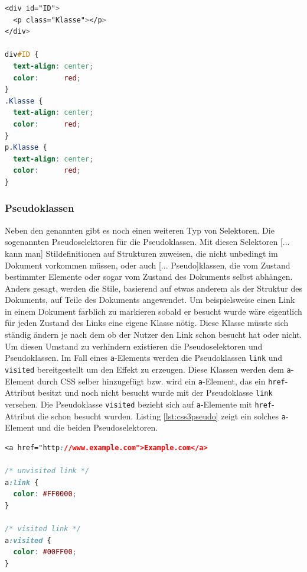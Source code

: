 \vspace{1em}
\begin{lstlisting}[language=CSS, caption=CSS3 Klassen- und ID-Selektoren, label=lst:css3idclass]
<div id="ID">
  <p class="Klasse"></p>
</div>

div#ID {
  text-align: center;
  color:      red;
}
.Klasse {
  text-align: center;
  color:      red;
}
p.Klasse {
  text-align: center;
  color:      red;
}
\end{lstlisting}
	
\subsubsection{Pseudoklassen} Neben den genannten gibt es noch einen weiteren Typ von Selektoren. Die sogenannten Pseudoselektoren für die Pseudoklassen. \glqq Mit diesen Selektoren [... kann man] Stildefinitionen auf Strukturen zuweisen, die nicht unbedingt im Dokument vorkommen müssen, oder auch [... Pseudo]klassen, die vom Zustand bestimmter Elemente oder sogar vom Zustand des Dokuments selbst abhängen. Anders gesagt, werden die Stile, basierend auf etwas anderem als der Struktur des Dokuments, auf Teile des Dokuments angewendet.\grqq{}\cite[S.53ff]{MeyeCasc2005} Um beispielsweise einen Link in einem Dokument farblich zu markieren sobald er besucht wurde wäre eigentlich für jeden Zustand des Links eine eigene Klasse nötig. Diese Klasse müsste sich ständig ändern je nach dem ob der Nutzer den Link schon besucht hat oder nicht. Um diesen Umstand zu verhindern existieren die Pseudoselektoren und Pseudoklassen. Im Fall eines \texttt{a}-Elements werden die Pseudoklassen \texttt{link} und \texttt{visited} bereitgestellt um den Effekt zu erzeugen. Diese Klassen werden dem \texttt{a}-Element durch CSS selber hinzugefügt bzw. wird ein \texttt{a}-Element, das ein \texttt{href}-Attribut besitzt und noch nicht besucht wurde mit der Pseudoklasse \texttt{link} versehen. Die Pseudoklasse \texttt{visited} bezieht sich auf \texttt{a}-Elemente mit \texttt{href}-Attribut die schon besucht wurden. Listing \ref{lst:css3pseudo} zeigt ein solches \texttt{a}-Element und die beiden Pseudoselektoren.

\vspace{1em}
\begin{lstlisting}[language=CSS, caption=CSS3 Pseudoklassen und -selektoren, label=lst:css3pseudo]
<a href="http://www.example.com">Example.com</a>

/* unvisited link */
a:link {
  color: #FF0000;
}

/* visited link */
a:visited {
  color: #00FF00;
}
\end{lstlisting}

